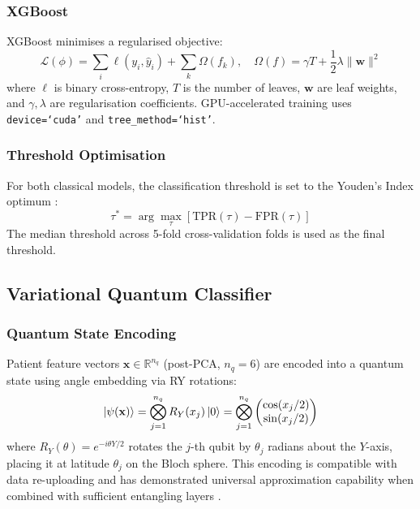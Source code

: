 ﻿\documentclass[conference]{IEEEtran}
\begin{document}
\subsubsection{XGBoost}

XGBoost \cite{chen2016xgboost} minimises a regularised objective:
\begin{equation}
    \mathcal{L}(\phi) = \sum_{i} \ell\!\left(y_i, \hat{y}_i\right)
    + \sum_{k} \Omega(f_k), \quad
    \Omega(f) = \gamma T + \frac{1}{2}\lambda \|\mathbf{w}\|^2
    \label{eq:xgboost}
\end{equation}
where $\ell$ is binary cross-entropy, $T$ is the number of leaves, $\mathbf{w}$ are leaf
weights, and $\gamma, \lambda$ are regularisation coefficients. GPU-accelerated training
uses \texttt{device=`cuda'} and \texttt{tree\_method=`hist'}.

\subsubsection{Threshold Optimisation}

For both classical models, the classification threshold is set to the Youden's Index
optimum \cite{youden1950index}:
\begin{equation}
    \tau^* = \arg\max_{\tau} \left[ \text{TPR}(\tau) - \text{FPR}(\tau) \right]
    \label{eq:youden}
\end{equation}
The median threshold across 5-fold cross-validation folds is used as the final threshold.

\subsection{Variational Quantum Classifier}

\subsubsection{Quantum State Encoding}

Patient feature vectors $\mathbf{x} \in \mathbb{R}^{n_q}$ (post-PCA, $n_q = 6$) are
encoded into a quantum state using angle embedding via RY rotations:
\begin{equation}
    \ket{\psi(\mathbf{x})} = \bigotimes_{j=1}^{n_q} R_Y(x_j) \ket{0}
    = \bigotimes_{j=1}^{n_q} \begin{pmatrix} \cos(x_j/2) \\ \sin(x_j/2) \end{pmatrix}
    \label{eq:angle_encoding}
\end{equation}
where $R_Y(\theta) = e^{-i\theta Y/2}$ rotates the $j$-th qubit by $\theta_j$ radians
about the $Y$-axis, placing it at latitude $\theta_j$ on the Bloch sphere. This encoding
is compatible with data re-uploading and has demonstrated universal approximation
capability when combined with sufficient entangling layers \cite{perez2020data}.
\end{document}
